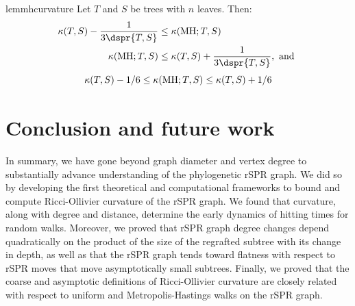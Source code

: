 \documentclass[10pt,twoside,leqno,twocolumn]{article}
\newcommand{\MH}{\operatorname{MH}}
\newcommand{\curvature}[2][]{%
    \ifthenelse{\equal{#1}{}}%
		{\kappa(#2)}%
		{\kappa_{#1}(#2)}%
}
\begin{document}
\begin{restatable}{lem}{mhcurvature}
	\label{lem:mh_curvature}
	Let $T$ and $S$ be trees with $n$ leaves. Then:
	\begin{align*}
	\curvature{T,S} - \frac{1}{3\dspr{T,S}}
	&\le \curvature{\MH; T,S} \\
	\curvature{\MH; T,S}
	&\le \curvature{T,S} + \frac{1}{3\dspr{T,S}},\text{ and }
\end{align*}
	$$\curvature{T,S} - 1/6
	\le \curvature{\MH; T,S}
	\le \curvature{T,S} + 1/6$$
\end{restatable}

\section{Conclusion and future work}
In summary, we have gone beyond graph diameter and vertex degree to substantially advance understanding of the phylogenetic rSPR graph.
We did so by developing the first theoretical and computational frameworks to bound and compute Ricci-Ollivier curvature of the rSPR graph.
We found that curvature, along with degree and distance, determine the early dynamics of hitting times for random walks.
Moreover, we proved that rSPR graph degree changes depend quadratically on the product of the size of the regrafted subtree with its change in depth, as well as that the rSPR graph tends toward flatness with respect to rSPR moves that move asymptotically small subtrees.
Finally, we proved that the coarse and asymptotic definitions of Ricci-Ollivier curvature are closely related with respect to uniform and Metropolis-Hastings walks on the rSPR graph.
\end{document}
